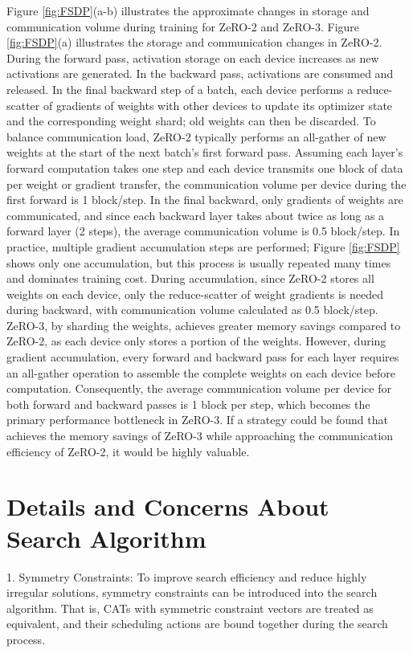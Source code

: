 \documentclass[letterpaper,twocolumn,10pt]{article}
\begin{document}
Figure \ref{fig:FSDP}(a-b) illustrates the approximate changes in storage and communication volume during training for ZeRO-2 and ZeRO-3. Figure \ref{fig:FSDP}(a) illustrates the storage and communication changes in ZeRO-2. During the forward pass, activation storage on each device increases as new activations are generated. In the backward pass, activations are consumed and released. In the final backward step of a batch, each device performs a reduce-scatter of gradients of weights with other devices to update its optimizer state and the corresponding weight shard; old weights can then be discarded. To balance communication load, ZeRO-2 typically performs an all-gather of new weights at the start of the next batch's first forward pass. Assuming each layer's forward computation takes one step and each device transmits one block of data per weight or gradient transfer, the communication volume per device during the first forward is 1 block/step. In the final backward, only gradients of weights are communicated, and since each backward layer takes about twice as long as a forward layer (2 steps), the average communication volume is 0.5 block/step. In practice, multiple gradient accumulation steps are performed; Figure \ref{fig:FSDP} shows only one accumulation, but this process is usually repeated many times and dominates training cost. During accumulation, since ZeRO-2 stores all weights on each device, only the reduce-scatter of weight gradients is needed during backward, with communication volume calculated as 0.5 block/step. ZeRO-3, by sharding the weights, achieves greater memory savings compared to ZeRO-2, as each device only stores a portion of the weights. However, during gradient accumulation, every forward and backward pass for each layer requires an all-gather operation to assemble the complete weights on each device before computation. Consequently, the average communication volume per device for both forward and backward passes is 1 block per step, which becomes the primary performance bottleneck in ZeRO-3. If a strategy could be found that achieves the memory savings of ZeRO-3 while approaching the communication efficiency of ZeRO-2, it would be highly valuable.

\section{Details and Concerns About Search Algorithm}
\label{sec:search_details}

1. Symmetry Constraints: To improve search efficiency and reduce highly irregular solutions, symmetry constraints can be introduced into the search algorithm. That is, CATs with symmetric constraint vectors are treated as equivalent, and their scheduling actions are bound together during the search process.
\end{document}
